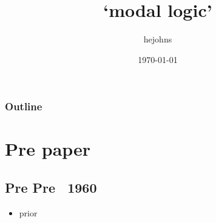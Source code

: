 \documentclass[aspectratio=169]{beamer}
\begin{document}
{}
\title[Judgmental Reconstruction]{`modal logic'}
\author{hejohns}
\date{\today}
\begin{frame}
    \titlepage
\end{frame}
\begin{frame}
    \frametitle{Outline}
    \tableofcontents
\end{frame}
\section{Pre paper}
\subsection{Pre Pre ~1960}
\begin{frame}
    \begin{itemize}
        \item prior
    \end{itemize}
\end{frame}
\end{document}
